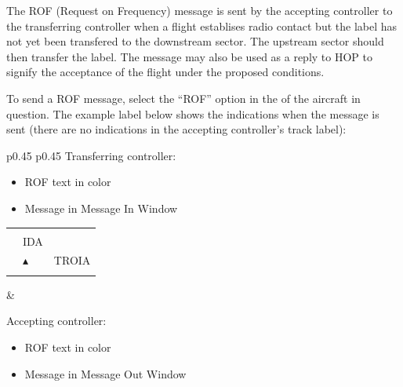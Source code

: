 \documentclass[a4paper,oneside,11pt]{memoir}
\begin{document}
The ROF (Request on Frequency) message is sent by the accepting controller to the transferring controller when a flight establises radio contact but the label has not yet been transfered to the downstream sector. The upstream sector should then transfer the label. The message may also be used as a reply to HOP to signify the acceptance of the flight under the proposed conditions.


To send a ROF message, select the “ROF” option in the  of the aircraft in question. The example label below shows the indications when the message is sent (there are no indications in the accepting controller’s track label):


\begin{longtable}{p{} p{}}
  Transferring controller:

  \begin{itemize}
    \item ROF text in  color
    \item Message in Message In Window
  \end{itemize}

  \begin{tabular}{
    >{\columncolor{Flight Highlight}}l 
    >{\columncolor{Flight Highlight}}l
    >{\columncolor{Flight Highlight}}l }
    {\color{Proposition In} ROF} & {\color{Coordination} }       & {\color{Assumed} }      \\
    {\color{Assumed} ABC123} & {\color{Coordination} IDA}       & {\color{Assumed} }      \\
    {\color{Assumed} 100}    & {\color{Assumed} $\blacktriangle$} & {\color{Assumed} TROIA} \\
    {\color{Assumed} 180}    & {\color{Assumed} }          & {\color{Assumed} }     
  \end{tabular}
  &
  
  Accepting controller:

  \begin{itemize}
    \item ROF text in  color
    \item Message in Message Out Window
  \end{itemize}
\end{longtable}
\end{document}
